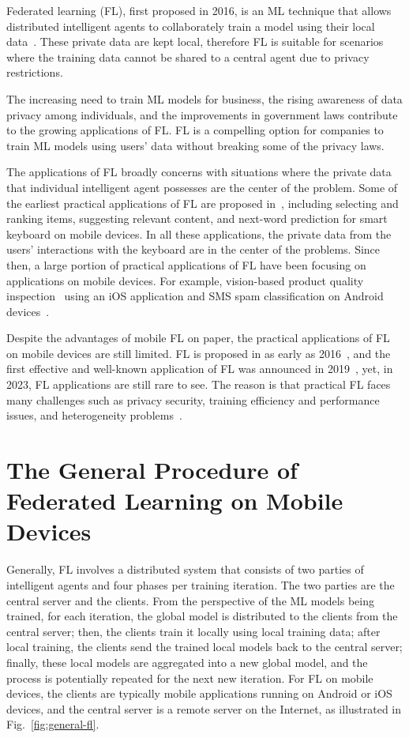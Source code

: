 \documentclass[conference]{IEEEtran}
\begin{document}
Federated learning (FL), first proposed in 2016, is an ML technique that
allows distributed intelligent agents to collaborately train a model using
their local data~\cite{mcmahan2017communication,yang2019federated}.
These private data are kept local,
therefore FL is suitable for scenarios where
the training data cannot be shared to a central agent due to
privacy restrictions.

The increasing need to train ML models for business,
the rising awareness of data privacy among individuals,
and the improvements in government laws contribute to
the growing applications of FL.
FL is a compelling option for companies to train ML models using users' data
without breaking some of the privacy laws.

The applications of FL broadly concerns with situations where
the private data that individual intelligent agent possesses are
the center of the problem.
Some of the earliest practical applications of FL are proposed
in~\cite{bonawitz2019towards},
including selecting and ranking items, suggesting relevant content,
and next-word prediction for smart keyboard on mobile devices.
In all these applications,
the private data from the users' interactions with
the keyboard are in the center of the problems.
Since then, a large portion of practical applications of FL have been
focusing on applications on mobile devices.
For example, vision-based product quality inspection~\cite{bharti2022edge} using
an iOS application and
SMS spam classification on Android devices~\cite{sriraman2022device}.

Despite the advantages of mobile FL on paper,
the practical applications of FL on mobile devices are still limited.
FL is proposed in as early as 2016~\cite{mcmahan2017communication},
and the first effective and well-known application of FL
was announced in 2019~\cite{bonawitz2019towards},
yet, in 2023, FL applications are still rare to see.
The reason is that practical FL faces many challenges such as
privacy security, training efficiency and performance issues,
and heterogeneity problems~\cite{wen2023survey}.

\section{The General Procedure of Federated Learning on Mobile Devices}

Generally, FL involves a distributed system that
consists of two parties of intelligent agents and
four phases per training iteration.
The two parties are the central server and the clients.
From the perspective of the ML models being trained,
for each iteration,
the global model is distributed to the clients from the central server;
then, the clients train it locally using local training data;
after local training,
the clients send the trained local models back to the central server;
finally, these local models are aggregated into a new global model,
and the process is potentially repeated for the next new iteration.
For FL on mobile devices,
the clients are typically mobile applications running on Android or iOS devices,
and the central server is a remote server on the Internet,
as illustrated in Fig.~\ref{fig:general-fl}.
\end{document}
